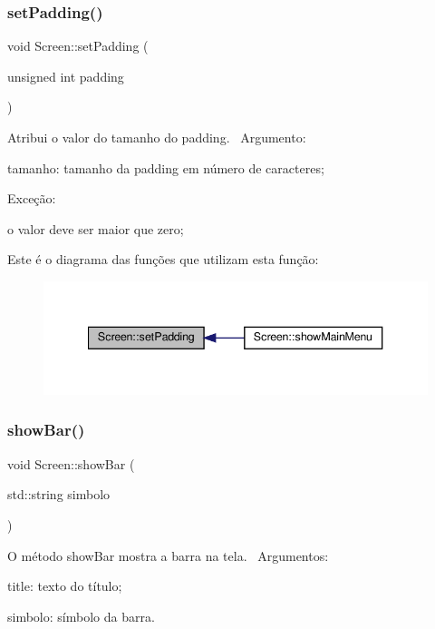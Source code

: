 \subsubsection{\texorpdfstring{set\+Padding()}{setPadding()}}
{\footnotesize\ttfamily void Screen\+::set\+Padding (\begin{DoxyParamCaption}\item[{unsigned int}]{padding }\end{DoxyParamCaption})}

Atribui o valor do tamanho do padding.~\newline
 Argumento\+:
\begin{DoxyItemize}
\item tamanho\+: tamanho da padding em número de caracteres;
\end{DoxyItemize}

Exceção\+:
\begin{DoxyItemize}
\item o valor deve ser maior que zero;
\end{DoxyItemize}Este é o diagrama das funções que utilizam esta função\+:\nopagebreak
\begin{figure}[H]
\begin{center}
\leavevmode
\includegraphics[width=340pt]{classScreen_a32771ff2a19f570bf35654e11971e938_icgraph}
\end{center}
\end{figure}
\mbox{\label{classScreen_a16bd8465322e12b669e26ecccd4a3704}} 
\subsubsection{\texorpdfstring{show\+Bar()}{showBar()}}
{\footnotesize\ttfamily void Screen\+::show\+Bar (\begin{DoxyParamCaption}\item[{std\+::string}]{simbolo }\end{DoxyParamCaption})}

O método show\+Bar mostra a barra na tela.~\newline
Argumentos\+:
\begin{DoxyItemize}
\item title\+: texto do título;
\item simbolo\+: símbolo da barra.
\end{DoxyItemize}

